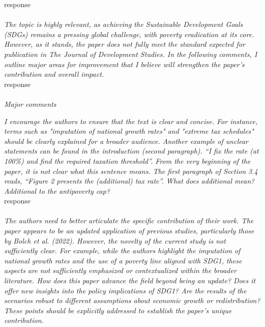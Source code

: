 \documentclass[12pt,english]{article}
\begin{document}
response
~\\ ~\\

\textit{The topic is highly relevant, as achieving the Sustainable Development Goals (SDGs) remains a pressing global challenge, with poverty eradication at its core. However, as it stands, the paper does not fully meet the standard expected for publication in The Journal of Development Studies. In the following comments, I outline major areas for improvement that I believe will strengthen the paper's contribution and overall impact.}~\\

response
~\\ ~\\ 

\textit{Major comments}

\textit{I encourage the authors to ensure that the text is clear and concise. For instance, terms such as "imputation of national growth rates" and "extreme tax schedules" should be clearly explained for a broader audience. Another example of unclear statements can be found in the introduction (second paragraph). “I fix the rate (at 100\%) and find the required taxation threshold”. From the very beginning of the paper, it is not clear what this sentence means. The first paragraph of Section 3.4 reads, “Figure 2 presents the (additional) tax rate”. What does additional mean? Additional to the antipoverty cap? }~\\

response
~\\ ~\\

\textit{The authors need to better articulate the specific contribution of their work. The paper appears to be an updated application of previous studies, particularly those by Bolch et al. (2022). However, the novelty of the current study is not sufficiently clear. For example, while the authors highlight the imputation of national growth rates and the use of a poverty line aligned with SDG1, these aspects are not sufficiently emphasized or contextualized within the broader literature. How does this paper advance the field beyond being an update? Does it offer new insights into the policy implications of SDG1? Are the results of the scenarios robust to different assumptions about economic growth or redistribution? These points should be explicitly addressed to establish the paper's unique contribution. }~\\
\end{document}
